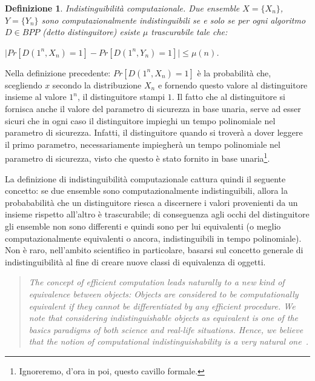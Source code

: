 \documentclass[a4paper,openright,twoside,12pt]{report}
\newtheorem{definizione}{Definizione}[chapter]
\begin{document}
\begin{definizione}{Indistinguibilit\`a computazionale.}
Due ensemble $X=\{X_n\}$, $Y=\{Y_n\}$ sono computazionalmente indistinguibili se e solo se per ogni algoritmo $D \in BPP$ (detto distinguitore) esiste $\mu$ trascurabile tale che:
\begin{center}$\lvert Pr[D(1^n, X_n) = 1] - Pr[D(1^n, Y_n) = 1] \rvert \leq \mu(n)$.\end{center}
\end{definizione}
Nella definizione precedente: $Pr[D(1^n, X_n) = 1]$ \`e la probabilit\`a che, scegliendo $x$ secondo la distribuzione $X_n$ e fornendo questo valore al distinguitore insieme al valore $1^n$, il distinguitore stampi $1$.
Il fatto che al distinguitore si fornisca anche il valore del parametro di sicurezza in base unaria, serve ad esser sicuri che in ogni caso il distinguitore impieghi un tempo polinomiale 
nel parametro di sicurezza.
Infatti, il distinguitore quando si trover\`a a dover leggere il primo parametro, necessariamente impiegher\`a un tempo polinomiale nel parametro di sicurezza, visto che questo \`e stato 
fornito in base unaria\footnote{Ignoreremo, d'ora in poi, questo cavillo formale.}.

La definizione di indistinguibilit\`a computazionale cattura quindi il seguente concetto: se due ensemble sono computazionalmente indistinguibili, 
allora la probababilit\`a che un distinguitore riesca a discernere i valori provenienti da un insieme rispetto all'altro \`e trascurabile; di conseguenza agli occhi del distinguitore 
gli ensemble non sono differenti e quindi sono per lui equivalenti (o meglio computazionalmente equivalenti o ancora, indistinguibili in tempo polinomiale). 
Non \`e raro, nell'ambito scientifico in particolare, basarsi sul concetto generale di indistinguibilit\`a al fine di creare nuove classi di equivalenza di oggetti.
\begin{quotation}
\emph{The concept of efficient computation leads naturally to a new kind of equivalence between objects: Objects are considered to be computationally equivalent if they cannot be
differentiated by any efficient procedure. We note that considering indistinguishable objects as equivalent is one of the basics paradigms of both science and real-life situations. Hence,
we believe that the notion of computational indistinguishability is a very natural one~\cite{519078}.}
\end{quotation}
\end{document}
